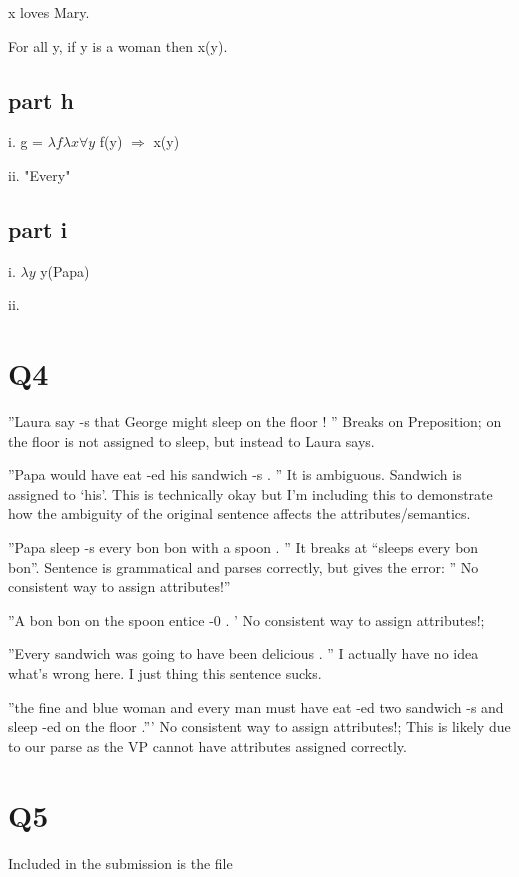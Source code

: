 \documentclass[12pt, letterpaper]{article}
\begin{document}
x loves Mary.

For all y, if y is a woman then x(y).

\subsection{part h}

i. g = $\lambda f \lambda x \forall y$ f(y) $\Rightarrow$ x(y)

ii. "Every"

\subsection{part i}

i. $\lambda y$ y(Papa)

ii. %

\section{Q4}

''Laura say -s that George might sleep on the floor ! ''
Breaks on Preposition; on the floor is not assigned to sleep, but instead to Laura says. 


''Papa would have eat -ed his sandwich -s . ''
It is ambiguous. Sandwich is assigned to `his'. This is technically okay but I'm including this to demonstrate how the ambiguity of the original sentence affects the attributes/semantics.

''Papa sleep -s every bon bon with a spoon . ''
It breaks at ``sleeps every bon bon''. Sentence is grammatical and parses correctly, but gives the error: '' No consistent way to assign attributes!''


''A bon bon on the spoon entice -0 . '
No consistent way to assign attributes!; 

''Every sandwich was going to have been delicious . ''
I actually have no idea what's wrong here. I just thing this sentence sucks.

''the fine and blue woman and every man must have eat -ed two sandwich -s and sleep -ed on the floor .'''
No consistent way to assign attributes!; This is likely due to our parse as the VP cannot have attributes assigned correctly. 


\section{Q5}
Included in the submission is the file
\end{document}
